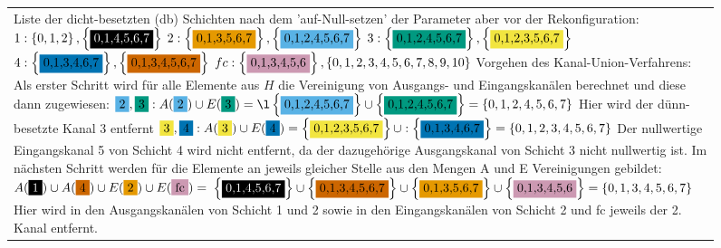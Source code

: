 \begin{figure}
\begin{minipage}[c]{1\linewidth}
\begin{tabularx}{1\textwidth}{m{0.2\textwidth}m{0.8\textwidth}}
\\
\multicolumn{2}{m{1\linewidth}}{Liste der dicht-besetzten (db) Schichten nach dem 'auf-Null-setzen' der Parameter aber vor der Rekonfiguration:\newline
$1:\left\{0,1,2\right\},\left\{\colorbox{black}{\textcolor{white}{0,1,4,5,6,7}}\right\}$\newline
$2:\left\{\colorbox{orange}{0,1,3,5,6,7}\right\},\left\{\colorbox{sky}{0,1,2,4,5,6,7}\right\}$\newline
$3:\left\{\colorbox{bluegreen}{0,1,2,4,5,6,7}\right\},\left\{\colorbox{yellow}{0,1,2,3,5,6,7}\right\}$\newline
$4:\left\{\colorbox{blue2}{0,1,3,4,6,7}\right\},\left\{\colorbox{vermi}{0,1,3,4,5,6,7}\right\}$\newline
$fc:\left\{\colorbox{purple}{0,1,3,4,5,6}\right\},\left\{0,1,2,3,4,5,6,7,8,9,10\right\}$\newline
Vorgehen des Kanal-Union-Verfahrens:
Als erster Schritt wird für alle Elemente aus $H$ die Vereinigung von Ausgangs- und Eingangskanälen berechnet und diese dann zugewiesen:\newline
$\colorbox{sky}{2},\colorbox{bluegreen}{3}:A(\colorbox{sky}{2}) \cup E(\colorbox{bluegreen}{3})= \l\left\{\colorbox{sky}{0,1,2,4,5,6,7}\right\} \cup \left\{\colorbox{bluegreen}{0,1,2,4,5,6,7}\right\} =\left\{0,1,2,4,5,6,7\right\} $\newline
Hier wird der dünn-besetzte Kanal 3 entfernt \newline
$\colorbox{yellow}{3},\colorbox{blue2}{4}: A(\colorbox{yellow}{3}) \cup E(\colorbox{blue2}{4}) =
\left\{\colorbox{yellow}{0,1,2,3,5,6,7}\right\} \cup :\left\{\colorbox{blue2}{0,1,3,4,6,7}\right\} =\left\{0,1,2,3,4,5,6,7\right\}$\newline
Der nullwertige Eingangskanal 5 von Schicht 4 wird nicht entfernt, da der dazugehörige Ausgangskanal von Schicht 3 nicht nullwertig ist.
Im nächsten Schritt werden für die Elemente an jeweils gleicher Stelle aus den Mengen A und E Vereinigungen gebildet:
$A(\colorbox{black}{\textcolor{white}{1}})\cup A(\colorbox{vermi}{4}) \cup E(\colorbox{orange}{2}) \cup E(\colorbox{purple}{fc})=$\newline
$\left\{\colorbox{black}{\textcolor{white}{0,1,4,5,6,7}}\right\} \cup \left\{\colorbox{vermi}{0,1,3,4,5,6,7}\right\} \cup \left\{\colorbox{orange}{0,1,3,5,6,7}\right\} \cup \left\{\colorbox{purple}{0,1,3,4,5,6}\right\} = \left\{ 0,1,3,4,5,6,7\right\}$\newline
Hier wird in den Ausgangskanälen von Schicht 1 und 2 sowie in den Eingangskanälen von Schicht 2 und fc jeweils der 2. Kanal entfernt.}
\end{tabularx}
\end{minipage}
\end{figure}



